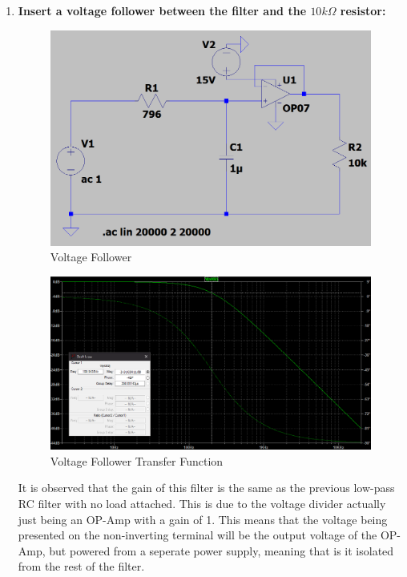\documentclass[a4paper,11pt]{article}
\begin{document}
\begin{flushleft}
\begin{enumerate}
		\item %
			\textbf{Insert a voltage follower between the filter and the $10k\Omega$ resistor:}
			\begin{figure}[ht]
				\centering
				\includegraphics[width=0.8\linewidth]{OP_AMP_FILTER}
				\caption{Voltage Follower}
			\end{figure}
		\newpage
			\begin{figure}[ht]
				\centering
				\includegraphics[width=0.8\linewidth]{RC_transfer_function}
				\caption{Voltage Follower Transfer Function}
			\end{figure}
			It is observed that the gain of this filter is the same as the previous low-pass RC filter 					with no load attached. This is due to the voltage divider actually just being an OP-Amp with 			a gain of 1. This means that the voltage being presented on the non-inverting terminal will 				be the output voltage of the OP-Amp, but powered from a seperate power supply, meaning that 				is it isolated from the rest of the filter.
		\end{enumerate}
		\newpage
	\enlargethispage{\baselineskip}

\end{flushleft}
\end{document}

